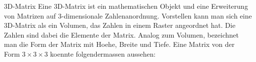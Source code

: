 \begin{defbox}{3D-Matrix}
  Eine 3D-Matrix ist ein mathematischen Objekt und eine Erweiterung von Matrizen
  auf 3-dimensionale Zahlenanordnung. Vorstellen kann man sich eine 3D-Matrix
  als ein Volumen, das Zahlen in einem Raster angeordnet hat.
  Die Zahlen sind dabei die Elemente der Matrix. Analog zum Volumen, bezeichnet
  man die Form der Matrix mit Hoehe, Breite und Tiefe.
  Eine Matrix von der Form $3 \times 3 \times 3$ koennte folgendermassen
  aussehen:
  \para{}








\end{defbox}

